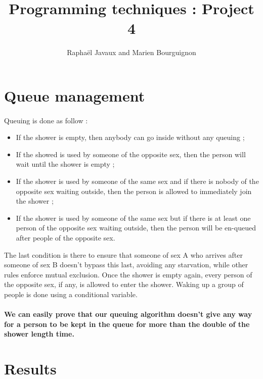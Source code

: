 \documentclass[a4paper]{article}
\title{Programming techniques : Project 4}
\author{Raphaël Javaux and Marien Bourguignon}
\date{}
\begin{document}
\maketitle

   \section{Queue management}

    \paragraph{}Queuing is done as follow :
    \begin{itemize}
        \item If the shower is empty, then anybody can go inside without any
        queuing ;
        \item If the showed is used by someone of the opposite sex, then the
        person will wait until the shower is empty ;
        \item If the shower is used by someone of the same sex and if there is
        nobody of the opposite sex waiting outside, then the person is allowed 
        to immediately join the shower ;
        \item If the shower is used by someone of the same sex but if there is 
        at least one person of the opposite sex waiting outside, then the person
        will be en-queued after people of the opposite sex.
    \end{itemize}
    The last condition is there to ensure that someone of sex A who arrives
    after someone of sex B doesn't bypass this last, avoiding any
    starvation, while other rules enforce mutual exclusion.\newline
    Once the shower is empty again, every person of the opposite sex, if any, is
    allowed to enter the shower. Waking up a group of people is done using a
    conditional variable.

    \paragraph{}\textbf{We can easily prove that our queuing algorithm doesn't
    give any way for a person to be kept in the queue for more than the double
    of the shower length time.}

  \section{Results}
\end{document}
